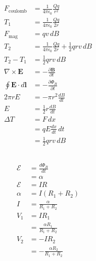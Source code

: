 \documentclass{article}
\renewcommand{\vec}[1]{\boldsymbol{\mathbf{#1}}}
\newcommand{\ke}{\frac{1}{4 \pi \epsilon_0}}
\begin{document}
\begin{align*}
  F_\text{coulomb}              & = \ke \frac{Q q}{r^2}                           \\
  T_1                           & = \ke \frac{Q q}{2 r}                           \\
  F_\text{mag}                  & = q v \,d B                                     \\
  T_2                           & = \ke \frac{Q q}{2 r} + \frac{1}{2} q r v \,d B \\
  T_2 - T_1                     & = \frac{1}{2} q r v \,d B                       \\
  \nabla \times \vec{E}         & = -\frac{\partial \vec{B}}{\partial t}          \\
  \oint \vec{E} \cdot d \vec{l} & = -\frac{\partial \Phi_B}{\partial t}           \\
  2 \pi r E                     & = -\pi r^2 \frac{d B}{d t}                      \\
  E                             & = \frac{1}{2} r \frac{d B}{d t}                 \\
  \Delta T                      & = F \,d x                                       \\
                                & = q E \frac{d x}{d t} \,d t                     \\
                                & = \frac{1}{2} q r v \,d B
\end{align*}

\subsection{}

\begin{align*}
  \mathcal{E} & = \frac{d \Phi_B}{d t}          \\
              & = \alpha                        \\
  \mathcal{E} & = I R                           \\
  \alpha      & = I (R_1 + R_2)                 \\
  I           & = \frac{\alpha}{R_1 + R_2}      \\
  V_1         & = I R_1                         \\
              & = \frac{\alpha R_1}{R_1 + R_2}  \\
  V_2         & = -I R_2                        \\
              & = -\frac{\alpha R_2}{R_1 + R_2}
\end{align*}
\end{document}
